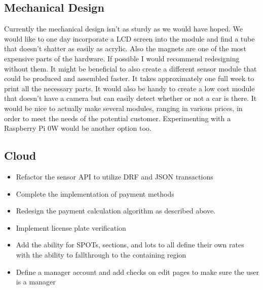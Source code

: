 \subsection{Mechanical Design}
Currently the mechanical design isn't as sturdy as we would have hoped.
We would like to one day incorporate a LCD screen into the module and find a tube that doesn't shatter as easily as acrylic. 
Also the magnets are one of the most expensive parts of the hardware. 
If possible I would recommend redesigning without them. 
It might be beneficial to also create a different sensor module that could be produced and assembled faster.
It takes approximately one full week to print all the necessary parts. 
It would also be handy to create a low cost module that doesn't have a camera but can easily detect whether or not a car is there. 
It would be nice to actually make several modules, ranging in various prices, in order to meet the needs of the potential customer.
Experimenting with a Raspberry Pi 0W would be another option too. 

\subsection{Cloud}
\begin{itemize}
    \item Refactor the sensor API to utilize DRF and JSON transactions
    \item Complete the implementation of payment methods
    \item Redesign the payment calculation algorithm as described above.
    \item Implement license plate verification
    \item Add the ability for SPOTs, sections, and lots to all define their own rates with the ability to fallthrough to the containing region
    \item Define a manager account and add checks on edit pages to make sure the user is a manager
\end{itemize}  